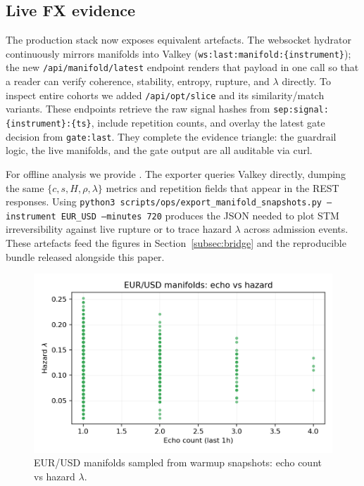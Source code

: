 \documentclass[11pt]{article}
\begin{document}
\subsection{Live FX evidence}
\label{subsec:live-evidence}
The production stack now exposes equivalent artefacts. The websocket hydrator
continuously mirrors manifolds into Valkey
(\texttt{ws:last:manifold:\{instrument\}}); the new
\texttt{/api/manifold/latest} endpoint renders that payload in one call so that a
reader can verify coherence, stability, entropy, rupture, and $\lambda$ directly.
To inspect entire cohorts we added \texttt{/api/opt/slice} and its similarity/match
variants. These endpoints retrieve the raw signal hashes from
\texttt{sep:signal:\{instrument\}:\{ts\}}, include repetition counts, and overlay the
latest gate decision from \texttt{gate:last}. They complete the
evidence triangle: the guardrail logic, the live manifolds, and the gate output
are all auditable via curl.

For offline analysis we provide
. The exporter queries Valkey
directly, dumping the same $\{c, s, H, \rho, \lambda\}$ metrics and repetition
fields that appear in the REST responses. Using
\texttt{python3 scripts/ops/export\_manifold\_snapshots.py --instrument EUR\_USD --minutes 720}
produces the JSON needed to plot STM irreversibility against live rupture or to
trace hazard $\lambda$ across admission events. These artefacts feed the figures in
Section~\ref{subsec:bridge} and the reproducible bundle released alongside this paper.

\begin{figure}[h]
  \centering
  \includegraphics[width=0.72\linewidth]{../figures/fig2_spt_echo_vs_lambda.png}
  \caption{EUR/USD manifolds sampled from warmup snapshots: echo count vs hazard $\lambda$.}
  \label{fig:spt-echo-lambda}
\end{figure}
\end{document}
